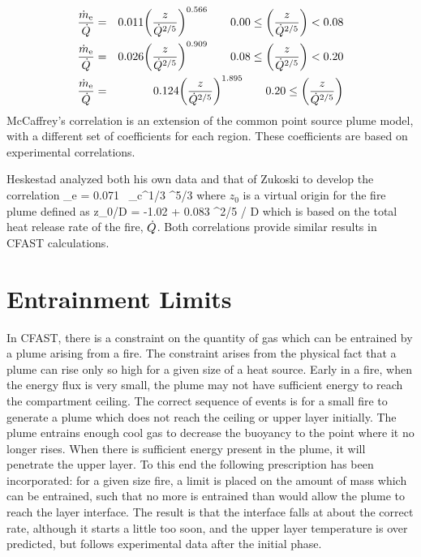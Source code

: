 \begin{eqnarray}
   \frac{\dot{m}_{\rm e}}{\dot{Q}} &=& 0.011 { \left( {\frac{z}{\dot{Q}^{2/5}}} \right) }^{0.566} \quad \quad   0.00 \leq { \left( {\frac{z}{\dot{Q}^{2/5}}} \right) }<0.08 \nonumber \\
   \frac{\dot{m}_{\rm e}}{\dot{Q}} &=& 0.026 { \left( {\frac{z}{\dot{Q}^{2/5}}} \right) }^{0.909} \quad \quad   0.08 \leq { \left( {\frac{z}{\dot{Q}^{2/5}}} \right) }<0.20 \label{eq:McCaffreyPlume} \\
   \frac{\dot{m}_{\rm e}}{\dot{Q}} &=& 0.124 { \left( {\frac{z}{\dot{Q}^{2/5}}} \right) }^{1.895} \quad \quad   0.20 \leq { \left( {\frac{z}{\dot{Q}^{2/5}}} \right) } \nonumber
\end{eqnarray}
McCaffrey's correlation is an extension of the common point source plume model, with a different set of coefficients for each region. These coefficients are based on experimental correlations.

Heskestad  analyzed both his own data \cite{Heskestad:1984} and that of Zukoski \cite{Zukoski:1981} to develop the correlation
\be 
   \dm_{\rm e} = 0.071 \, \dQ_{\rm c}^{1/3} \; ^{5/3} \;  
\ee
where $z_0$ is a virtual origin for the fire plume defined as 
\be
  z_0/D = -1.02 + 0.083 \dQ^{2/5} / D
\ee
which is based on the total heat release rate of the fire, $\dot{Q}$.  Both correlations provide similar results in CFAST calculations.

\section{Entrainment Limits}

In CFAST, there is a constraint on the quantity of gas which can be entrained by a plume arising from a fire.  The constraint arises from the physical fact that a plume can rise only so high for a given size of a heat source.  Early in a fire, when the energy flux is very small, the plume may not have sufficient energy to reach the compartment ceiling. The correct sequence of events is for a small fire to generate a plume which does not reach the ceiling or upper layer initially.  The plume entrains enough cool gas to decrease the buoyancy to the point where it no longer rises. When there is sufficient energy present in the plume, it will penetrate the upper layer.  To this end the following prescription has been incorporated:  for a given size fire, a limit is placed on the amount of mass which can be entrained, such that no more is entrained than would allow the plume to reach the layer interface.  The result is that the interface falls at about the correct rate, although it starts a little too soon, and the upper layer temperature is over predicted, but follows experimental data after the initial phase.

